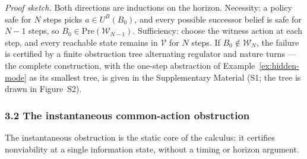 \documentclass[10pt,twocolumn]{article}
\theoremstyle{definition}
\begin{document}
\emph{Proof sketch.} Both directions are inductions on the horizon. Necessity: a policy safe for \(N\) steps picks \(a \in U^B(B_0)\), and every possible successor belief is safe for \(N - 1\) steps, so \(B_0 \in \mathrm{Pre}(\mathcal{W}_{N-1})\). Sufficiency: choose the witness action at each step, and every reachable state remains in \(\mathcal{V}\) for \(N\) steps. If \(B_0 \notin \mathcal{W}_N\), the failure is certified by a finite obstruction tree alternating regulator and nature turns --- the complete construction, with the one-step abstraction of Example~\ref{ex:hidden-mode} as its smallest tree, is given in the Supplementary Material (S1; the tree is drawn in Figure~S2).

\subsubsection{3.2 The instantaneous common-action
obstruction}\label{the-instantaneous-common-action-obstruction}

The instantaneous obstruction is the static core of the calculus: it certifies nonviability at a single information state, without a timing or horizon argument.
\end{document}
